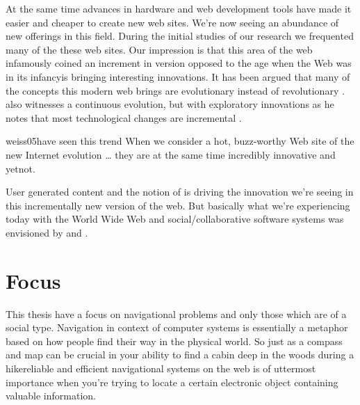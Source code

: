 At the same time advances in hardware and web development tools have made it
easier and cheaper to create new web sites. We're now seeing an
abundance of new offerings in this field.
During the initial studies of our research we frequented
many of the these web sites. Our impression is that
this area of the web infamously coined \dash{}an
increment in version opposed to the age when the Web was in its
infancy\dash{}is bringing interesting innovations.
It has been argued that many of the concepts this modern web brings are
evolutionary instead of revolutionary \citep[]{yakovlev07}.
\citet[]{treese06} also witnesses a continuous evolution, but with
exploratory innovations as he notes that most technological changes are
incremental%
.
\begin{fullquote}[\p{18}]{weiss05}{have seen this trend}
  When we consider a hot, buzz-worthy Web site of the new Internet evolution
  \ldots
  they are at the same time incredibly innovative and yet\dash{}not.
\end{fullquote}

User generated content and the notion of %
is driving the innovation we're seeing in this incrementally new version of
the web. But basically what we're experiencing today with the World Wide Web
and social/collaborative software systems was envisioned by \citet{bush45}
and \citet{licklider68}.

\section{Focus}

This thesis have a focus on navigational problems and only those
which are of a social type.%
Navigation in context of computer systems is
essentially a metaphor based on how people find their way in the physical
world. So just as a compass and map can be crucial in your ability to find a
cabin deep in the woods during a hike\dash{}reliable and efficient
navigational systems on the web is of uttermost importance when you're trying
to locate a certain electronic object containing valuable information.

